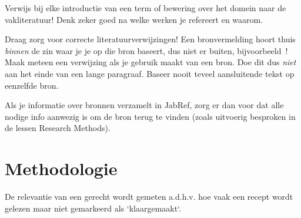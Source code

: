 \documentclass{hogent-article}
\begin{document}
Verwijs bij elke introductie van een term of bewering over het domein naar de vakliteratuur! Denk zeker goed na welke werken je refereert en waarom.

Draag zorg voor correcte literatuurverwijzingen! Een bronvermelding hoort thuis \emph{binnen} de zin waar je je op die bron baseert, dus niet er buiten, bijvoorbeeld~\autocite{Hykes2013}! Maak meteen een verwijzing als je gebruik maakt van een bron. Doe dit dus \emph{niet} aan het einde van een lange paragraaf. Baseer nooit teveel aansluitende tekst op eenzelfde bron.

Als je informatie over bronnen verzamelt in JabRef, zorg er dan voor dat alle nodige info aanwezig is om de bron terug te vinden (zoals uitvoerig besproken in de lessen Research Methods).


\section{Methodologie}%
\label{sec:methodologie}


De relevantie van een gerecht wordt gemeten a.d.h.v. hoe vaak een recept wordt gelezen maar niet gemarkeerd als `klaargemaakt`.
\end{document}
